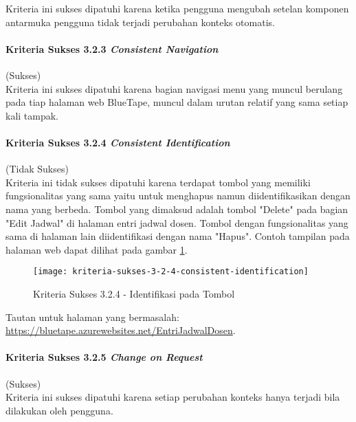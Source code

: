 Kriteria ini sukses dipatuhi karena ketika pengguna mengubah setelan komponen antarmuka pengguna tidak terjadi perubahan konteks otomatis.

\paragraph{Kriteria Sukses 3.2.3 \textit{Consistent Navigation}}
\label{par:kepatuhan_bluetape_kriteria_sukses_3.2.3}
(Sukses)\\

Kriteria ini sukses dipatuhi karena bagian navigasi menu yang muncul berulang pada tiap halaman web BlueTape, muncul dalam urutan relatif yang sama setiap kali tampak.

\paragraph{Kriteria Sukses 3.2.4 \textit{Consistent Identification}}
\label{par:kepatuhan_bluetape_kriteria_sukses_3.2.4}
(Tidak Sukses)\\

Kriteria ini tidak sukses dipatuhi karena terdapat tombol yang memiliki fungsionalitas yang sama yaitu untuk menghapus namun diidentifikasikan dengan nama yang berbeda. Tombol yang dimaksud adalah tombol "Delete" pada bagian "Edit Jadwal" di halaman entri jadwal dosen. Tombol dengan fungsionalitas yang sama di halaman lain diidentifikasi dengan nama "Hapus". Contoh tampilan pada halaman web dapat dilihat pada gambar \ref{fig:3.2.4_consistent_identification}. 

\begin{figure}[H]
	\centering  
	\texttt{[image: kriteria-sukses-3-2-4-consistent-identification]}  
	\caption[Kriteria Sukses 3.2.4 - Identifikasi pada Tombol]{Kriteria Sukses 3.2.4 - Identifikasi pada Tombol}
	\label{fig:3.2.4_consistent_identification}  
\end{figure}

Tautan untuk halaman yang bermasalah: \url{https://bluetape.azurewebsites.net/EntriJadwalDosen}.

\paragraph{Kriteria Sukses 3.2.5 \textit{Change on Request}}
\label{par:kepatuhan_bluetape_kriteria_sukses_3.2.5}
(Sukses)\\

Kriteria ini sukses dipatuhi karena setiap perubahan konteks hanya terjadi bila dilakukan oleh pengguna.

